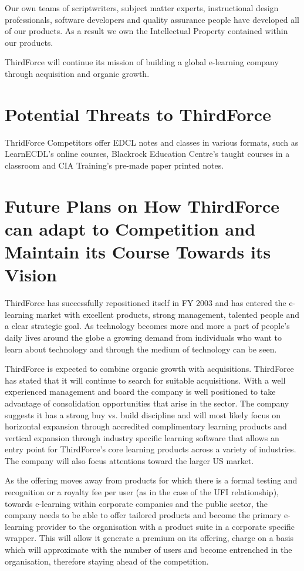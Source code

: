 \documentclass[a4paper,12pt]{article}
\begin{document}
Our own teams of scriptwriters, subject matter experts, instructional
design professionals, software developers and quality assurance
people have developed all of our products. As a result we own the
Intellectual Property contained within our products.

ThirdForce will continue its mission of building a global e-learning
company through acquisition and organic growth. 

\section*{Potential Threats to ThirdForce}

ThridForce Competitors offer EDCL notes and classes in various
formats, such as LearnECDL's online courses, Blackrock Education
Centre's taught courses in a classroom and CIA Training's pre-made
paper printed notes.

\section*{Future Plans on How ThirdForce can adapt to Competition and Maintain
its Course Towards its Vision}

ThirdForce has successfully repositioned itself in FY 2003 and has
entered the e-learning market with excellent products, strong
management, talented people and a clear strategic goal. As technology
becomes more and more a part of people's daily lives around the
globe a growing demand from individuals who want to learn about
technology and through the medium of technology can be seen.

ThirdForce is expected to combine organic growth with acquisitions.
ThirdForce has stated that it will continue to search for suitable
acquisitions. With a well experienced management and board the
company is well positioned to take advantage of consolidation
opportunities that arise in the sector. The company suggests it has a
strong buy vs. build discipline and will most likely focus on
horizontal expansion through accredited complimentary learning
products and vertical expansion through industry specific learning
software that allows an entry point for ThirdForce's core
learning products across a variety of industries. The company will
also focus attentions toward the larger US market. 

As the offering moves away from products for which there is a formal
testing and recognition or a royalty fee per user (as in the case of
the UFI relationship), towards e-learning within corporate companies
and the public sector, the company needs to be able to offer tailored
products and become the primary e-learning provider to the
organisation with a product suite in a corporate specific wrapper.
This will allow it generate a premium on its offering, charge on a
basis which will approximate with the number of users and become
entrenched in the organisation, therefore staying ahead of the
competition.
\end{document}
